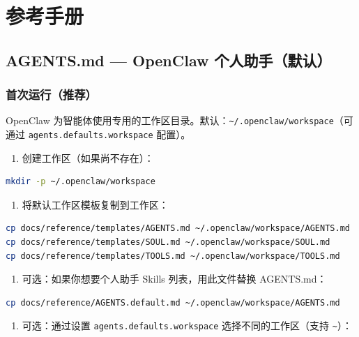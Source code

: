 \chapter{参考手册}

\section{AGENTS.md — OpenClaw 个人助手（默认）}


\subsection{首次运行（推荐）}


OpenClaw 为智能体使用专用的工作区目录。默认：\texttt{\textasciitilde{}/.openclaw/workspace}（可通过 \texttt{agents.defaults.workspace} 配置）。

\begin{enumerate}
  \item 创建工作区（如果尚不存在）：
\end{enumerate}


\begin{lstlisting}[language=bash]
mkdir -p ~/.openclaw/workspace
\end{lstlisting}


\begin{enumerate}
  \item 将默认工作区模板复制到工作区：
\end{enumerate}


\begin{lstlisting}[language=bash]
cp docs/reference/templates/AGENTS.md ~/.openclaw/workspace/AGENTS.md
cp docs/reference/templates/SOUL.md ~/.openclaw/workspace/SOUL.md
cp docs/reference/templates/TOOLS.md ~/.openclaw/workspace/TOOLS.md
\end{lstlisting}


\begin{enumerate}
  \item 可选：如果你想要个人助手 Skills 列表，用此文件替换 AGENTS.md：
\end{enumerate}


\begin{lstlisting}[language=bash]
cp docs/reference/AGENTS.default.md ~/.openclaw/workspace/AGENTS.md
\end{lstlisting}


\begin{enumerate}
  \item 可选：通过设置 \texttt{agents.defaults.workspace} 选择不同的工作区（支持 \texttt{\textasciitilde{}}）：
\end{enumerate}


